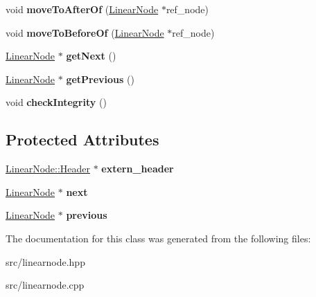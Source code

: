 \begin{DoxyCompactItemize}
void {\bfseries move\+To\+After\+Of} (\hyperlink{classDataJuggler_1_1LinearNode}{Linear\+Node} $\ast$ref\+\_\+node)
\item 
\mbox{\label{classDataJuggler_1_1LinearNode_a6a8f2d832a1a7ca316a4b14669aca860}} 
void {\bfseries move\+To\+Before\+Of} (\hyperlink{classDataJuggler_1_1LinearNode}{Linear\+Node} $\ast$ref\+\_\+node)
\item 
\mbox{\label{classDataJuggler_1_1LinearNode_ad18b966d7264cd5c6261655c56436d58}} 
\hyperlink{classDataJuggler_1_1LinearNode}{Linear\+Node} $\ast$ {\bfseries get\+Next} ()
\item 
\mbox{\label{classDataJuggler_1_1LinearNode_a06b7c34901d308f4c67b5e0379644d46}} 
\hyperlink{classDataJuggler_1_1LinearNode}{Linear\+Node} $\ast$ {\bfseries get\+Previous} ()
\item 
\mbox{\label{classDataJuggler_1_1LinearNode_a65a630fe0ecaa3116104384244832fd0}} 
void {\bfseries check\+Integrity} ()
\end{DoxyCompactItemize}
\subsection*{Protected Attributes}
\begin{DoxyCompactItemize}
\item 
\mbox{\label{classDataJuggler_1_1LinearNode_ae23d8323287867bbd82db20016d71816}} 
\hyperlink{classDataJuggler_1_1LinearNode_1_1Header}{Linear\+Node\+::\+Header} $\ast$ {\bfseries extern\+\_\+header}
\item 
\mbox{\label{classDataJuggler_1_1LinearNode_a6c06f41841a53b82acba198539f296ef}} 
\hyperlink{classDataJuggler_1_1LinearNode}{Linear\+Node} $\ast$ {\bfseries next}
\item 
\mbox{\label{classDataJuggler_1_1LinearNode_aa7db37fb5b7ec634303d391678821db7}} 
\hyperlink{classDataJuggler_1_1LinearNode}{Linear\+Node} $\ast$ {\bfseries previous}
\end{DoxyCompactItemize}


The documentation for this class was generated from the following files\+:\begin{DoxyCompactItemize}
\item 
src/linearnode.\+hpp\item 
src/linearnode.\+cpp\end{DoxyCompactItemize}
